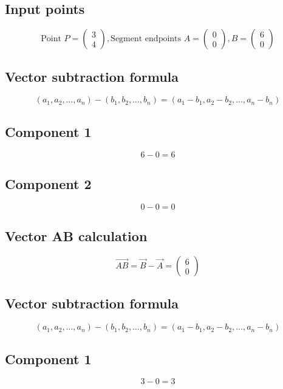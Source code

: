 \documentclass{article}
\begin{document}
\subsection*{ \vspace{1em} Input points}
\[
\text{Point } P = \begin{pmatrix}3 \\ 4\end{pmatrix}, 
      \text{Segment endpoints } A = \begin{pmatrix}0 \\ 0\end{pmatrix}, B = \begin{pmatrix}6 \\ 0\end{pmatrix}
\]
\subsection*{ \vspace{1em} Vector subtraction formula}
\[
(a_1, a_2, \dots, a_n) - (b_1, b_2, \dots, b_n) = (a_1 - b_1, a_2 - b_2, \dots, a_n - b_n)
\]
\subsection*{ \vspace{1em} Component 1}
\[
6 - 0 = 6
\]
\subsection*{ \vspace{1em} Component 2}
\[
0 - 0 = 0
\]
\subsection*{ \vspace{1em} Vector AB calculation}
\[
\vec{AB} = \vec{B} - \vec{A} = \begin{pmatrix}6 \\ 0\end{pmatrix}
\]
\subsection*{ \vspace{1em} Vector subtraction formula}
\[
(a_1, a_2, \dots, a_n) - (b_1, b_2, \dots, b_n) = (a_1 - b_1, a_2 - b_2, \dots, a_n - b_n)
\]
\subsection*{ \vspace{1em} Component 1}
\[
3 - 0 = 3
\]
\end{document}
